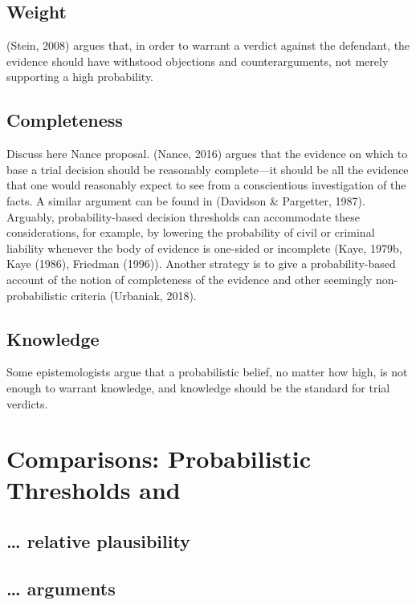 \documentclass[10pt,dvipsnames]{scrartcl}
\begin{document}
\subsection{Weight}\label{weight}

(Stein, 2008) argues that, in order to warrant a verdict against the
defendant, the evidence should have withstood objections and
counterarguments, not merely supporting a high probability.

\subsection{Completeness}\label{completeness}

Discuss here Nance proposal. (Nance, 2016) argues that the evidence on
which to base a trial decision should be reasonably complete---it should
be all the evidence that one would reasonably expect to see from a
conscientious investigation of the facts. A similar argument can be
found in (Davidson \& Pargetter, 1987). Arguably, probability-based
decision thresholds can accommodate these considerations, for example,
by lowering the probability of civil or criminal liability whenever the
body of evidence is one-sided or incomplete (Kaye, 1979b, Kaye (1986),
Friedman (1996)). Another strategy is to give a probability-based
account of the notion of completeness of the evidence and other
seemingly non-probabilistic criteria (Urbaniak, 2018).

\subsection{Knowledge}\label{knowledge}

Some epistemologists argue that a probabilistic belief, no matter how
high, is not enough to warrant knowledge, and knowledge should be the
standard for trial verdicts.

\section{Comparisons: Probabilistic Thresholds
and}\label{comparisons-probabilistic-thresholds-and}

\subsection{\ldots{} relative
plausibility}\label{relative-plausibility-1}

\subsection{\ldots{} arguments}\label{arguments-1}
\end{document}
